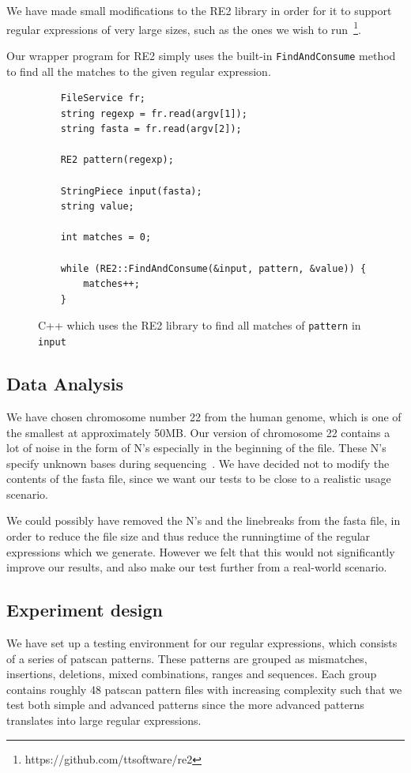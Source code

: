 \documentclass[12pt]{article}
\theoremstyle{definition}
\begin{document}
We have made small modifications to the RE2 library in order for it to support regular expressions of very large sizes, such as the ones we wish to run~\footnote{https://github.com/ttsoftware/re2}.

Our wrapper program for RE2 simply uses the built-in \texttt{FindAndConsume} method to find all the matches to the given regular expression.

\begin{figure}[H]
	\begin{lstlisting}
	FileService fr;
    string regexp = fr.read(argv[1]);
    string fasta = fr.read(argv[2]);

    RE2 pattern(regexp);

    StringPiece input(fasta);
    string value;
    
    int matches = 0;

    while (RE2::FindAndConsume(&input, pattern, &value)) {
        matches++;
    }
	\end{lstlisting}
	\caption{C++ which uses the RE2 library to find all matches of \texttt{pattern} in \texttt{input}}
\end{figure}

\subsection{Data Analysis}

We have chosen chromosome number 22 from the human genome, which is one of the smallest at approximately 50MB. Our version of chromosome 22 contains a lot of noise in the form of N's especially in the beginning of the file. These N's specify unknown bases during sequencing~\cite{human-genome}. We have decided not to modify the contents of the fasta file, since we want our tests to be close to a realistic usage scenario.

We could possibly have removed the N's and the linebreaks from the fasta file, in order to reduce the file size and thus reduce the runningtime of the regular expressions which we generate. However we felt that this would not significantly improve our results, and also make our test further from a real-world scenario.

\subsection{Experiment design}

We have set up a testing environment for our regular expressions, which consists of a series of patscan patterns. These patterns are grouped as mismatches, insertions, deletions, mixed combinations, ranges and sequences. Each group contains roughly 48 patscan pattern files with increasing complexity such that we test both simple and advanced patterns since the more advanced patterns translates into large regular expressions. 
\end{document}
